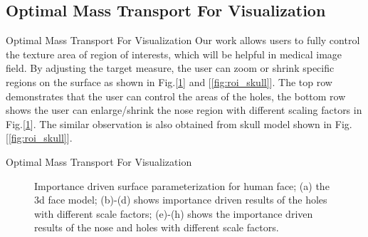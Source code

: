 \documentclass{beamer}
\theoremstyle{definition}
\begin{document}
\subsection{Optimal Mass Transport For Visualization}
\begin{frame}{Optimal Mass Transport For Visualization}
Our work\cite{su2016area} allows users to fully control the texture area of region of interests, which will be helpful in medical image field. By adjusting the target measure, the user can zoom or shrink specific regions on the surface as shown in Fig.[\ref{fig:roi_face}] and [\ref{fig:roi_skull}]. The top row demonstrates that the user can control the areas of the holes, the bottom row shows the user can enlarge/shrink the nose region with different scaling factors in Fig.[\ref{fig:roi_face}]. The similar observation is also obtained from skull model shown in Fig.[\ref{fig:roi_skull}].
\end{frame}




\begin{frame}{Optimal Mass Transport For Visualization}
\begin{figure}
\centering
{}

\caption{Importance driven surface parameterization for human face; (a) the 3d face model; (b)-(d) shows importance driven results of the holes with different scale factors; (e)-(h) shows the importance driven results of the nose and holes with different scale factors.}
\label{fig:roi_face}
\end{figure}
\end{frame}
\end{document}
